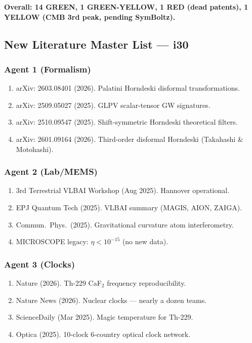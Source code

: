 \documentclass[11pt,a4paper]{article}
\begin{document}
\textbf{Overall: 14 GREEN, 1 GREEN-YELLOW, 1 RED (dead patents), 1 YELLOW (CMB 3rd peak, pending SymBoltz).}

\subsection{New Literature Master List --- i30}

\subsubsection{Agent 1 (Formalism)}
\begin{enumerate}
\item arXiv: 2603.08401 (2026). Palatini Horndeski disformal transformations.
\item arXiv: 2509.05027 (2025). GLPV scalar-tensor GW signatures.
\item arXiv: 2510.09547 (2025). Shift-symmetric Horndeski theoretical filters.
\item arXiv: 2601.09164 (2026). Third-order disformal Horndeski (Takahashi \& Motohashi).
\end{enumerate}

\subsubsection{Agent 2 (Lab/MEMS)}
\begin{enumerate}
\item 3rd Terrestrial VLBAI Workshop (Aug 2025). Hannover operational.
\item EPJ Quantum Tech (2025). VLBAI summary (MAGIS, AION, ZAIGA).
\item Commun.\ Phys.\ (2025). Gravitational curvature atom interferometry.
\item MICROSCOPE legacy: $\eta < 10^{-15}$ (no new data).
\end{enumerate}

\subsubsection{Agent 3 (Clocks)}
\begin{enumerate}
\item Nature (2026). Th-229 CaF$_2$ frequency reproducibility.
\item Nature News (2026). Nuclear clocks --- nearly a dozen teams.
\item ScienceDaily (Mar 2025). Magic temperature for Th-229.
\item Optica (2025). 10-clock 6-country optical clock network.
\end{enumerate}
\end{document}
